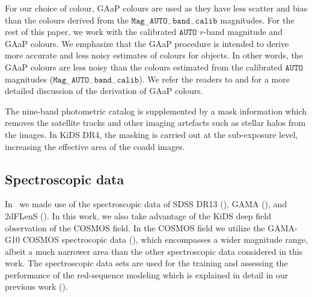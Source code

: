 \documentclass[fleqn,usenatbib,useAMS]{mnras}
\begin{document}
For our choice of colour, GAaP colours are used as they have less scatter and bias than the colours derived from the $\mathtt{Mag}_{-}\mathtt{AUTO}_{-}\mathtt{band}_{-}\mathtt{calib}$ magnitudes. For the rest of this paper, we work with the calibrated $\mathtt{AUTO}$ $r$-band magnitude and GAaP colours. We emphasize that the GAaP procedure is intended to derive more accurate and less noisy estimates of colours for objects. In other words, the GAaP colours are less noisy than the colours estimated from the calibrated $\mathtt{AUTO}$ magnitudes ($\mathtt{Mag}_{-}\mathtt{AUTO}_{-}\mathtt{band}_{-}\mathtt{calib}$). We refer the readers to \citet{kuijken2015} and \citet{kids_dr3} for a more detailed discussion of the derivation of GAaP colours.

The nine-band photometric catalog is supplemented by a mask information
which removes the satellite tracks and other imaging artefacts such as stellar halos from the images. In KiDS DR4, the masking is carried out at the sub-exposure level, increasing the effective area of the coadd images. 

\subsection{Spectroscopic data}\label{sec:spec}

In~\citet{vakili2019} we made use of the spectroscopic data of SDSS DR13 (\citealt{sdss_dr13}), GAMA (\citealt{driver2011}), and 2dFLenS (\citealt{blake2016}). In this work, we also take advantage of the KiDS deep field observation of the COSMOS field. In the COSMOS field we utilize the GAMA-G10 COSMOS spectrocopic data (\citealt{davis2017}), which encompasses a wider magnitude range, albeit a much narrower area than the other spectroscopic data considered in this work.
The spectroscopic data sets are used for the training and assessing the performance of the red-sequence modeling which is explained in detail in our previous work (\citealt{vakili2019}). 

\end{document}
